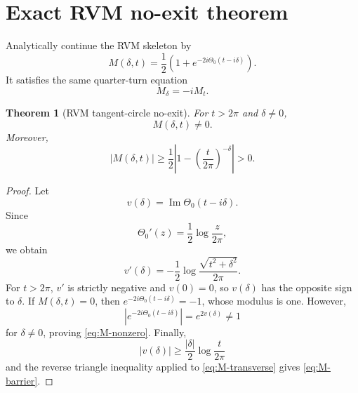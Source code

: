 \documentclass[11pt]{amsart}
\numberwithin{equation}{section}
\newtheorem{theorem}{Theorem}[section]
\theoremstyle{definition}
\theoremstyle{remark}
\newcommand{\Imm}{\operatorname{Im}}
\begin{document}
\section{Exact RVM no-exit theorem}
\label{sec:rvm-no-exit}

Analytically continue the RVM skeleton by
\begin{equation}
M(\delta,t)=\frac12\left(1+e^{-2i\Theta_0(t-i\delta)}\right).
\label{eq:M-transverse}
\end{equation}
It satisfies the same quarter-turn equation
\begin{equation}
M_\delta=-iM_t.
\label{eq:M-quarter-turn}
\end{equation}

\begin{theorem}[RVM tangent-circle no-exit]
\label{thm:rvm-no-exit}
For $t>2\pi$ and $\delta\neq0$,
\begin{equation}
M(\delta,t)\neq0.
\label{eq:M-nonzero}
\end{equation}
Moreover,
\begin{equation}
|M(\delta,t)|
\ge
\frac12\left|1-\left(\frac{t}{2\pi}\right)^{-\delta}\right|>0.
\label{eq:M-barrier}
\end{equation}
\end{theorem}

\begin{proof}
Let
\begin{equation}
v(\delta)=\Imm\Theta_0(t-i\delta).
\label{eq:v-definition}
\end{equation}
Since
\begin{equation}
\Theta_0'(z)=\frac12\log\frac{z}{2\pi},
\label{eq:Theta0-prime}
\end{equation}
we obtain
\begin{equation}
v'(\delta)=-\frac12\log\frac{\sqrt{t^2+\delta^2}}{2\pi}.
\label{eq:v-prime}
\end{equation}
For $t>2\pi$, $v'$ is strictly negative and $v(0)=0$, so $v(\delta)$ has the opposite sign to $\delta$.  If $M(\delta,t)=0$, then $e^{-2i\Theta_0(t-i\delta)}=-1$, whose modulus is one.  However,
\begin{equation}
\left|e^{-2i\Theta_0(t-i\delta)}\right|=e^{2v(\delta)}\neq1
\label{eq:RVM-modulus-neq1}
\end{equation}
for $\delta\neq0$, proving \eqref{eq:M-nonzero}.  Finally,
\begin{equation}
|v(\delta)|\ge\frac{|\delta|}{2}\log\frac{t}{2\pi}
\label{eq:v-lower}
\end{equation}
and the reverse triangle inequality applied to \eqref{eq:M-transverse} gives \eqref{eq:M-barrier}.
\end{proof}
\end{document}
